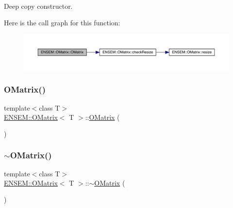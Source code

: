 Deep copy constructor. 

Here is the call graph for this function\+:
\nopagebreak
\begin{figure}[H]
\begin{center}
\leavevmode
\includegraphics[width=350pt]{dd/d80/classENSEM_1_1OMatrix_a695677059e35f7e9933f2b55d2eacb52_cgraph}
\end{center}
\end{figure}
\mbox{\label{classENSEM_1_1OMatrix_a65e880b856888dfd55e3f96b87afa0e7}} 
\subsubsection{\texorpdfstring{OMatrix()}{OMatrix()}\hspace{0.1cm}{\footnotesize\ttfamily [3/4]}}
{\footnotesize\ttfamily template$<$class T$>$ \\
\mbox{\hyperlink{classENSEM_1_1OMatrix}{E\+N\+S\+E\+M\+::\+O\+Matrix}}$<$ T $>$\+::\mbox{\hyperlink{classENSEM_1_1OMatrix}{O\+Matrix}} (\begin{DoxyParamCaption}{ }\end{DoxyParamCaption})\hspace{0.3cm}{\ttfamily [inline]}}

\mbox{\label{classENSEM_1_1OMatrix_a776f568bf59002385426232cba0c0d57}} 
\subsubsection{\texorpdfstring{$\sim$OMatrix()}{~OMatrix()}\hspace{0.1cm}{\footnotesize\ttfamily [2/2]}}
{\footnotesize\ttfamily template$<$class T$>$ \\
\mbox{\hyperlink{classENSEM_1_1OMatrix}{E\+N\+S\+E\+M\+::\+O\+Matrix}}$<$ T $>$\+::$\sim$\mbox{\hyperlink{classENSEM_1_1OMatrix}{O\+Matrix}} (\begin{DoxyParamCaption}{ }\end{DoxyParamCaption})\hspace{0.3cm}{\ttfamily [inline]}}

